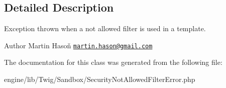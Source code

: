 \subsection{Detailed Description}
Exception thrown when a not allowed filter is used in a template.

\begin{DoxyAuthor}{Author}
Martin Hasoň \href{mailto:martin.hason@gmail.com}{\tt martin.\+hason@gmail.\+com} 
\end{DoxyAuthor}


The documentation for this class was generated from the following file\+:\begin{DoxyCompactItemize}
\item 
engine/lib/\+Twig/\+Sandbox/Security\+Not\+Allowed\+Filter\+Error.\+php\end{DoxyCompactItemize}
